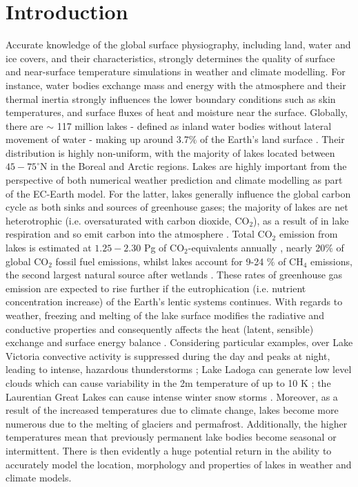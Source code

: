 \documentclass[hess, twostagejnl]{copernicus}
\begin{document}
\section{Introduction}
Accurate knowledge of the global surface physiography, including land, water and ice covers, and their characteristics, strongly determines the quality of surface and near-surface temperature simulations in weather and climate modelling. For instance, water bodies exchange mass and energy with the atmosphere and their thermal inertia strongly influences the lower boundary conditions such as skin temperatures, and surface fluxes of heat and moisture near the surface. Globally, there are $\sim$ 117 million lakes - defined as inland water bodies without lateral movement of water - making up around 3.7$\%$ of the Earth's land surface \citep{Verpoorter2014}. Their distribution is highly non-uniform, with the majority of lakes located between $45-75^{\circ}$N in the Boreal and Arctic regions. Lakes are highly important from the perspective of both numerical weather prediction and climate modelling as part of the EC-Earth model. For the latter, lakes generally influence the global carbon cycle as both sinks and sources of greenhouse gases; the majority of lakes are net heterotrophic (i.e. oversaturated with carbon dioxide, CO$_2$), as a result of in lake respiration and so emit carbon into the atmosphere \citep{Pace2005,Tranvik2009}.  Total CO$_2$ emission from lakes is estimated at $1.25 - 2.30$ Pg of CO$_2$-equivalents annually \citep{DelSontro2018}, nearly $20 \%$ of global CO$_2$ fossil fuel emissions, whilst lakes account for 9-24 $\%$  of CH$_4$ emissions, the second largest natural source after wetlands \citep{Saunois2020}. These rates of greenhouse gas emission are expected to rise further if the eutrophication (i.e. nutrient concentration increase) of the Earth's lentic systems continues. With regards to weather, freezing and melting of the lake surface modifies the radiative and conductive properties and consequently affects the heat (latent, sensible) exchange and surface energy balance \citep{Franz2018,Huang2019,Peng2020}. Considering particular examples, over Lake Victoria convective activity is suppressed during the day and peaks at night, leading to intense, hazardous thunderstorms \citep{Thiery2015,Thiery_2017}; Lake Ladoga can generate low level clouds which can cause variability in the 2m temperature of up to 10 K \citep{Eerola2014}; the Laurentian Great Lakes can cause intense winter snow storms \citep{Notaro2013,Vavrus2013}. Moreover, as a result of the increased temperatures due to climate change, lakes become more numerous due to the melting of glaciers and permafrost. Additionally, the higher temperatures mean that previously permanent lake bodies become seasonal or intermittent. There is then evidently a huge potential return in the ability to accurately model the location, morphology and properties of lakes in weather and climate models. \newline 
\end{document}
